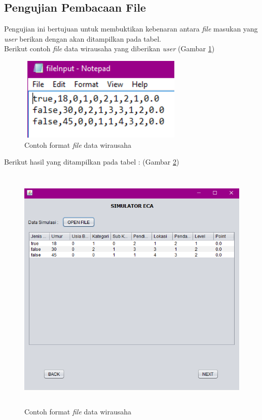 \subsection{Pengujian Pembacaan File}
Pengujian ini bertujuan untuk membuktikan kebenaran antara \textit{file} masukan yang \textit{user} berikan dengan akan ditampilkan pada tabel.\\
Berikut contoh \textit{file} data wirausaha yang diberikan \textit{user} (Gambar \ref{formatFile})

	\begin{figure} [H]
	\centering  
	\includegraphics[width=8cm, height=4cm]{formatFile} 
		\caption[Contoh format \textit{file} data wirausaha]{Contoh format \textit{file} data wirausaha}
	\label{formatFile} 
\end{figure}

Berikut hasil yang ditampilkan pada tabel : (Gambar \ref{tampilanData})

	\begin{figure} [H]
	\centering  
	\includegraphics[width=12cm, height=12cm]{tampilanData} 
		\caption[Contoh format \textit{file} data wirausaha]{Contoh format \textit{file} data wirausaha}
	\label{tampilanData} 
\end{figure}

